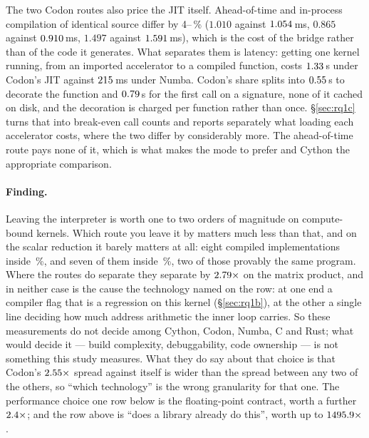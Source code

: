 The two Codon routes also price the JIT itself. Ahead-of-time and in-process compilation of
identical source differ by 4--\,\% ($1.010$ against $\meas{med:b1_compute-314:arraysum/codon_jit:ms}{1.054}$\,ms, $0.865$ against $\meas{med:b1_compute-314:mandelbrot/codon_jit:ms}{0.910}$\,ms,
$1.497$ against $\meas{med:b1_compute-314:matmul/codon_jit:ms}{1.591}$\,ms), which is the cost of the bridge rather than of the code it
generates. What separates them is latency: getting one kernel running, from an imported
accelerator to a compiled function, costs $\meas{fact:b1_breakeven-314:facts.codon_cost_s.compile_s}{1.33}$\,s under Codon's JIT against $\meas{fact:b1_breakeven-314:facts.numba_compile_s:ms}{215}$\,ms under
Numba. Codon's share splits into $\meas{fact:b1_breakeven-314:facts.codon_cost_s.decorate_s}{0.55}$\,s to decorate the function and $\meas{fact:b1_breakeven-314:facts.codon_cost_s.first_call_s}{0.79}$\,s for the
first call on a signature, none of it cached on disk, and the decoration is charged per
function rather than once. \S\ref{sec:rq1c} turns that into break-even call counts and
reports separately what loading each accelerator costs, where the two differ by considerably
more. The ahead-of-time route pays none of it, which is what makes  the mode to
prefer and Cython the appropriate comparison.

\paragraph{Finding.} Leaving the interpreter is worth one to two orders of magnitude on
compute-bound kernels. Which route you leave it by matters much less than that, and on the
scalar reduction it barely matters at all: eight compiled implementations inside \,\%, and seven of
them inside \,\%, two of those provably the same program. Where the routes do separate they separate by
$\meas{ratio:b1_compute-314:matmul/codon_jit|b1_compute-314:matmul/numba}{2.79}\times$ on the matrix product, and in neither case is the cause the technology named on
the row: at one end a compiler flag that is a regression on this kernel (\S\ref{sec:rq1b}), at
the other a single line deciding how much address arithmetic the inner loop carries. So these measurements do
not decide among Cython, Codon, Numba, C and Rust; what would decide it --- build complexity,
debuggability, code ownership --- is not something this study measures. What they do say
about that choice is that Codon's $\meas{ratio:b1_compute-314:matmul/codon_pyext|b1_compute-314:matmul/codon_pyext_ptr}{2.55}\times$ spread against itself is
wider than the spread between any two of the others, so ``which technology'' is the wrong
granularity for that one. The performance choice one row below is the floating-point contract,
worth a further $\meas{ratio:b1_compute-314:arraysum/numba|b1_compute-314:arraysum/numba_fastmath}{2.4}\times$; and the row above is ``does a library already do this'', worth up
to $\meas{ratio:b1_compute-314:matmul/cpython_loop|b1_compute-314:matmul/numpy}{1495.9}\times$.


